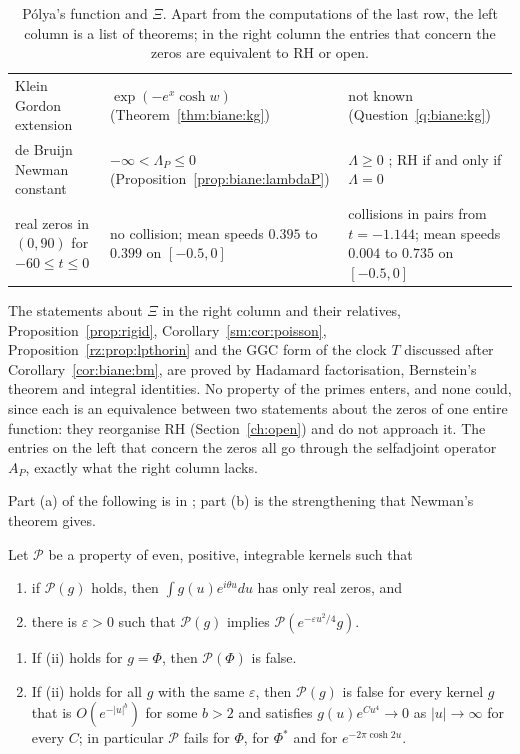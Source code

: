 \begin{table}[htbp]
\begin{tabular}{@{}p{}p{}p{}@{}}
Klein Gordon extension & $\exp(-e^x\cosh w)$ (Theorem~\ref{thm:biane:kg}) & not known (Question~\ref{q:biane:kg})\\
de Bruijn Newman constant & $-\infty<\Lambda_P\le0$ (Proposition~\ref{prop:biane:lambdaP}) & $\Lambda\ge0$ \cite{RodgersTao}; RH if and only if $\Lambda=0$\\
real zeros in $(0,90)$ for $-60\le t\le0$ & no collision; mean speeds $0.395$ to $0.399$ on $[-0.5,0]$ & collisions in pairs from $t=-1.144$; mean speeds $0.004$ to $0.735$ on $[-0.5,0]$\\
\bottomrule
\end{tabular}
\caption{P\'olya's function and $\Xi$. Apart from the computations of the last row, the left column is a list of theorems; in the right column the entries that concern the zeros are equivalent to RH or open.}
\label{tab:biane:compare}
\end{table}

The statements about $\Xi$ in the right column and their relatives, Proposition~\ref{prop:rigid}, Corollary~\ref{sm:cor:poisson}, Proposition~\ref{rz:prop:lpthorin} and the GGC form of the clock $T$ discussed after Corollary~\ref{cor:biane:bm}, are proved by Hadamard factorisation, Bernstein's theorem and integral identities. No property of the primes enters, and none could, since each is an equivalence between two statements about the zeros of one entire function: they reorganise RH (Section~\ref{ch:open}) and do not approach it. The entries on the left that concern the zeros all go through the selfadjoint operator $A_P$, exactly what the right column lacks.

Part (a) of the following is in \cite{P26bia}; part (b) is the strengthening that Newman's theorem gives.

\begin{proposition}\label{prop:biane:damping}
Let $\mathcal P$ be a property of even, positive, integrable kernels such that
\begin{enumerate}
\item[(i)] if $\mathcal P(g)$ holds, then $\int g(u)e^{i\theta u}du$ has only real zeros, and
\item[(ii)] there is $\varepsilon>0$ such that $\mathcal P(g)$ implies $\mathcal P(e^{-\varepsilon u^2/4}g)$.
\end{enumerate}
\begin{enumerate}
\item[(a)] If (ii) holds for $g=\Phi$, then $\mathcal P(\Phi)$ is false.
\item[(b)] If (ii) holds for all $g$ with the same $\varepsilon$, then $\mathcal P(g)$ is false for every kernel $g$ that is $O(e^{-|u|^b})$ for some $b>2$ and satisfies $g(u)e^{Cu^4}\to0$ as $|u|\to\infty$ for every $C$; in particular $\mathcal P$ fails for $\Phi$, for $\Phi^*$ and for $e^{-2\pi\cosh2u}$.
\end{enumerate}
\end{proposition}

